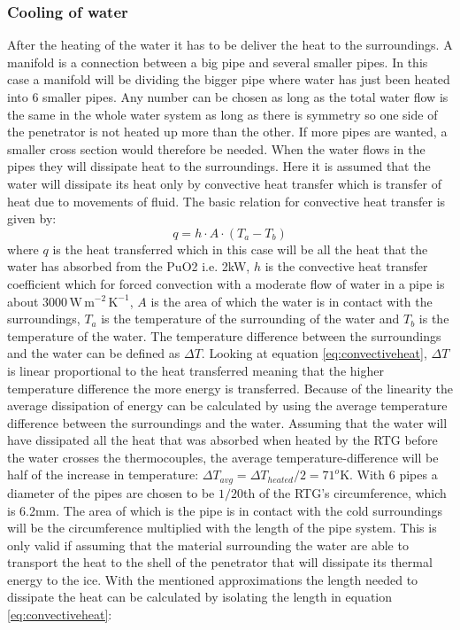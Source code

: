 \subsubsection{Cooling of water}
After the heating of the water it has to be deliver the heat to the surroundings. A manifold is a connection between a big pipe and several smaller pipes. In this case a manifold will be dividing the bigger pipe where water has just been heated into 6 smaller pipes. Any number can be chosen as long as the total water flow is the same in the whole water system as long as there is symmetry so one side of the penetrator is not heated up more than the other. If more pipes are wanted, a smaller cross section would therefore be needed. When the water flows in the pipes they will dissipate heat to the surroundings. Here it is assumed that the water will dissipate its heat only by convective heat transfer which is transfer of heat due to movements of fluid. The basic relation for convective heat transfer is given by:
\begin{equation}\label{eq:convectiveheat}
q = h \cdot A \cdot (T_a - T_b)
\end{equation}
where $q$ is the heat transferred which in this case will be all the heat that the water has absorbed from the PuO2 i.e. 2kW, $h$ is the convective heat transfer coefficient which for forced convection with a moderate flow of water in a pipe is about $3000 \, \mathrm{W \, m^{-2} \, K^{-1}}$\cite{website:waterconvection}, $A$ is the area of which the water is in contact with the surroundings, $T_a$ is the temperature of the surrounding of the water and $T_b$ is the temperature of the water. The temperature difference between the surroundings and the water can be defined as $\Delta T$. Looking at equation \ref{eq:convectiveheat}, $\Delta T$ is linear proportional to the heat transferred meaning that the higher temperature difference the more energy is transferred. Because of the linearity the average dissipation of energy can be calculated by using the average temperature difference between the surroundings and the water. Assuming that the water will have dissipated all the heat that was absorbed when heated by the RTG before the water crosses the thermocouples, the average temperature-difference will be half of the increase in temperature: $\Delta T_{avg} = \Delta T_{heated} / 2 = 71^o$K. With 6 pipes a diameter of the pipes are chosen to be $1/20$th of the RTG's circumference, which is 6.2mm.
The area of which is the pipe is in contact with the cold surroundings will be the circumference multiplied with the length of the pipe system. This is only valid if assuming that the material surrounding the water are able to transport the heat to the shell of the penetrator that will dissipate its thermal energy to the ice. With the mentioned approximations the length needed to dissipate the heat can be calculated by isolating the length in equation \ref{eq:convectiveheat}:

